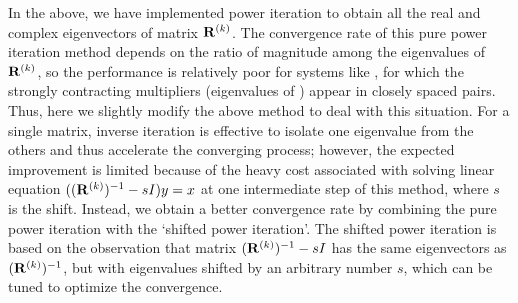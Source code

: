 \begin{description}
In the above, we have implemented power iteration to obtain all the real
and complex eigenvectors of matrix $\mathbf{R}^{(k)}$. The convergence rate of
this pure power iteration method depends on the ratio of magnitude among
the eigenvalues of $\mathbf{R}^{(k)}$, so the performance is relatively poor for
systems like \KSe, for which the strongly contracting multipliers
(eigenvalues of \JacobianM) appear in closely spaced pairs. Thus,
here
we slightly modify the above method to deal with this situation.
For a
single matrix, inverse iteration is effective to isolate
one eigenvalue from the others and thus accelerate the converging
process; however, the expected improvement is limited
because of the heavy cost
associated with solving linear equation $((\mathbf{R}^{(k)})^{-1}-sI)y=x$ at one
intermediate step of this method, where $s$ is the shift. Instead, we
obtain a better convergence rate by combining the pure power iteration
with the `shifted power iteration'. The shifted power iteration is based
on the observation that matrix $(\mathbf{R}^{(k)})^{-1}-sI$ has the same
eigenvectors as $(\mathbf{R}^{(k)})^{-1}$, but with eigenvalues shifted by an
arbitrary number $s$, which can be tuned to optimize the convergence.


\end{description}
